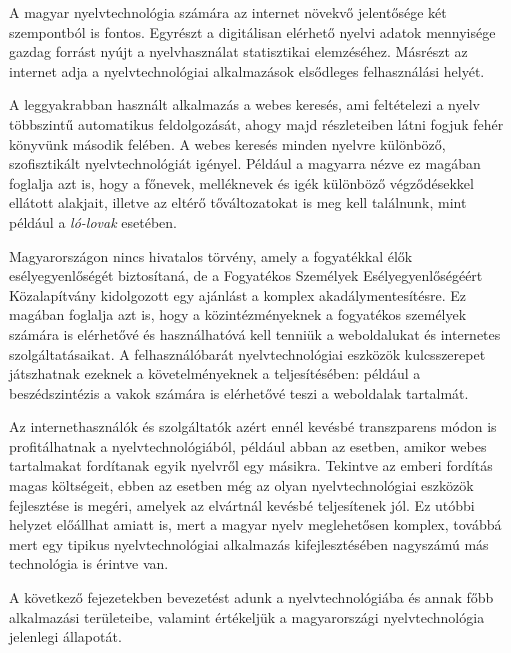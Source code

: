 \begin{multicols}{2}
  A magyar nyelvtechnológia számára az internet növekvő jelentősége két szempontból is fontos. Egyrészt a digitálisan elérhető nyelvi adatok mennyisége gazdag forrást nyújt a nyelvhasználat statisztikai elemzéséhez. Másrészt az internet adja a nyelvtechnológiai alkalmazások elsődleges felhasználási helyét. 

  A leggyakrabban használt alkalmazás a webes keresés, ami feltételezi a nyelv többszintű automatikus feldolgozását, a\-hogy majd részleteiben látni fogjuk fehér könyvünk második felében. A webes keresés minden nyelvre különböző, szo\-fisz\-ti\-kált nyelvtechnológiát igényel. Például a magyarra nézve ez magában foglalja azt is, hogy a főnevek, melléknevek és igék különböző végződésekkel ellátott alakjait, illetve az eltérő tőváltozatokat is meg kell találnunk, mint például a \textit{ló-lovak} ese\-té\-ben.  

  Magyarországon nincs hivatalos törvény, amely a fogyatékkal élők esélyegyenlőségét biztosítaná, de a Fogyatékos Személyek Esélyegyenlőségéért Közalapítvány kidolgozott egy ajánlást a komplex akadálymentesítésre. Ez magában foglalja azt is, hogy a közintézményeknek a fo\-gya\-té\-kos személyek számára is elérhetővé és használhatóvá kell tenniük a weboldalukat és internetes szolgáltatásaikat. A felhasználóbarát nyelvtechnológiai eszközök kulcsszerepet játszhatnak ezeknek a kö\-ve\-tel\-mé\-nyek\-nek a teljesítésében: például a beszédszintézis a vakok számára is elérhetővé teszi a weboldalak tartalmát.   

  Az internethasználók és szolgáltatók azért ennél kevésbé transzparens módon is pro\-fi\-tál\-hat\-nak a nyelvtechnológiából, például abban az esetben, amikor webes tartalmakat fordítanak egyik nyelvről egy másikra. Tekintve az emberi fordítás magas költségeit, ebben az esetben még az olyan nyelvtechnológiai eszközök fej\-lesz\-té\-se is megéri, amelyek az elvártnál kevésbé teljesítenek jól. Ez utóbbi helyzet előállhat amiatt is, mert a magyar nyelv meglehetősen komplex, továbbá mert egy tipikus nyelvtechnológiai alkalmazás ki\-fej\-lesz\-té\-sé\-ben nagyszámú más technológia is érintve van.

  A következő fejezetekben bevezetést adunk a nyelvtechnológiába és annak főbb al\-kal\-ma\-zá\-si területeibe, valamint értékeljük a magyarországi nyelvtechnológia jelenlegi állapotát.

  \end{multicols}

  \clearpage


